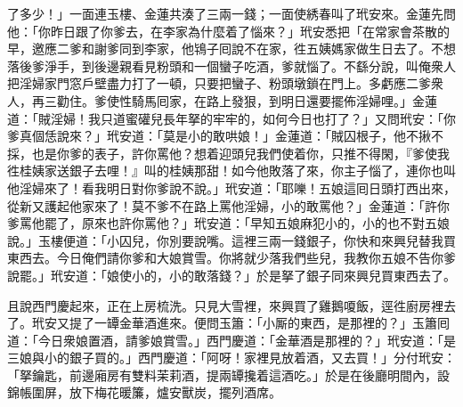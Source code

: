 了多少！」一面連玉樓、金蓮共湊了三兩一錢；一面使綉春叫了玳安來。金蓮先問他：「你昨日跟了你爹去，在李家為什麼着了惱來？」{}玳安悉把「在常家會茶散的早，邀應二爹和謝爹同到李家，他鴇子囘說不在家，徃五姨媽家做生日去了。不想落後爹淨手，到後邊親看見粉頭和一個蠻子吃酒，爹就惱了。不繇分說，叫俺衆人把淫婦家門窓戶壁盡力打了一頓，只要把蠻子、粉頭墩鎖在門上。多虧應二爹衆人，再三勸住。爹使性騎馬囘家，在路上發狠，到明日還要擺佈淫婦哩。」金蓮道：「賊淫婦！我只道蜜礶兒長年拏的牢牢的，如何今日也打了？」又問玳安：「你爹真個恁說來？」{}玳安道：「莫是小的敢哄娘！」金蓮道：「賊囚根子，他不揪不採，也是你爹的表子，許你罵他？{}想着迎頭兒我們使着你，只推不得閑，『爹使我徃桂姨家送銀子去哩！』叫的桂姨那甜！如今他敗落了來，你主子惱了，連你也叫他淫婦來了！看我明日對你爹說不說。」玳安道：「耶嚛！五娘這囘日頭打西出來，從新又護起他家來了！莫不爹不在路上罵他淫婦，小的敢罵他？」金蓮道：「許你爹罵他罷了，原來也許你罵他？」玳安道：「早知五娘麻犯小的，小的也不對五娘說。」玉樓便道：「小囚兒，你別要說嘴。{}這裡三兩一錢銀子，你快和來興兒替我買東西去。今日俺們請你爹和大娘賞雪。你將就少落我們些兒，我教你五娘不告你爹說罷。」玳安道：「娘使小的，小的敢落錢？」於是拏了銀子同來興兒買東西去了。

且說西門慶起來，正在上房梳洗。只見大雪裡，來興買了雞鵝嗄飯，逕徃廚房裡去了。玳安又提了一罈金華酒進來。便問玉簫：「小厮的東西，是那裡的？」玉簫囘道：「今日衆娘置酒，請爹娘賞雪。」西門慶道：「金華酒是那裡的？」玳安道：「是三娘與小的銀子買的。」西門慶道：「阿呀！家裡見放着酒，又去買！」分付玳安：「拏鑰匙，前邊廂房有雙料茉莉酒，提兩罈攙着這酒吃。」於是在後廳明間內，設錦帳圍屏，放下梅花暖簾，爐安獸炭，擺列酒席。

